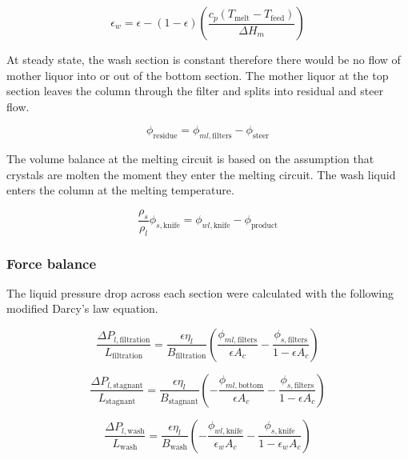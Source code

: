 \begin{equation}
\epsilon_{w}= \epsilon-(1-\epsilon)\left(\frac{c_p(T_{\mathrm{melt}}-T_{\mathrm{feed}})}{\Delta H_m}\right)
\end{equation}

At steady state, the wash section is constant therefore there  would be no flow of mother liquor into or out of the bottom section. The mother liquor at the top section leaves the column through the filter and splits into residual and steer flow. 

\begin{equation}
\phi_{\mathrm{residue}}= \phi_{ml,\mathrm{filters}} - \phi_{\mathrm{steer}}
\end{equation}

The volume balance at the melting circuit is based on the assumption that crystals are molten the moment they enter the melting circuit. The wash liquid enters the column at the melting temperature. 

\begin{equation}
\frac{\rho_s}{\rho_l}\phi_{s,\mathrm{knife}}= \phi_{wl,\mathrm{knife}} - \phi_{\mathrm{product}}
\end{equation}


\subsubsection{Force balance}
The liquid pressure drop across each section were calculated with the following modified Darcy's law equation. 

\begin{equation}
\frac{\Delta P_{l,\mathrm{filtration}}}{L_{\mathrm{filtration}}}=\frac{\epsilon \eta_{l}}{B_{\mathrm{filtration}}}\left(\frac{\phi_{ml,\mathrm{filters}}}{\epsilon A_c} - \frac{\phi_{s,\mathrm{filters}}}{1-\epsilon A_c}\right)
\end{equation}

\begin{equation}
\frac{\Delta P_{l,\mathrm{stagnant}}}{L_{\mathrm{stagnant}}}=\frac{\epsilon \eta_{l}}{B_{\mathrm{stagnant}}}\left(-\frac{\phi_{ml,\mathrm{bottom}}}{\epsilon A_c} - \frac{\phi_{s,\mathrm{filters}}}{1-\epsilon A_c}\right)
\end{equation}

\begin{equation}
\frac{\Delta P_{l,\mathrm{wash}}}{L_{\mathrm{wash}}}=\frac{\epsilon \eta_{l}}{B_{\mathrm{wash}}}\left(-\frac{\phi_{wl,\mathrm{knife}}}{\epsilon_w A_c} - \frac{\phi_{s,\mathrm{knife}}}{1-\epsilon_w A_c}\right)
\end{equation}

